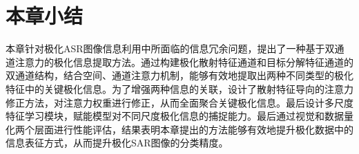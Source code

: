 \begin{table}[h]
    \caption{San Francisco地区实验数据集有标签样本数量}
    \label{san_smaple}
\end{table}

\section{本章小结}
本章针对极化ASR图像信息利用中所面临的信息冗余问题，提出了一种基于双通道注意力的极化信息提取方法。通过构建极化散射特征通道和目标分解特征通道的双通道结构，结合空间、通道注意力机制，能够有效地提取出两种不同类型的极化特征中的关键极化信息。为了增强两种信息的关联，设计了散射特征导向的注意力修正方法，对注意力权重进行修正，从而全面聚合关键极化信息。最后设计多尺度特征学习模块，赋能模型对不同尺度极化信息的捕捉能力。最后通过视觉和数据量化两个层面进行性能评估，结果表明本章提出的方法能够有效地提升极化数据中的信息表征方式，从而提升极化SAR图像的分类精度。